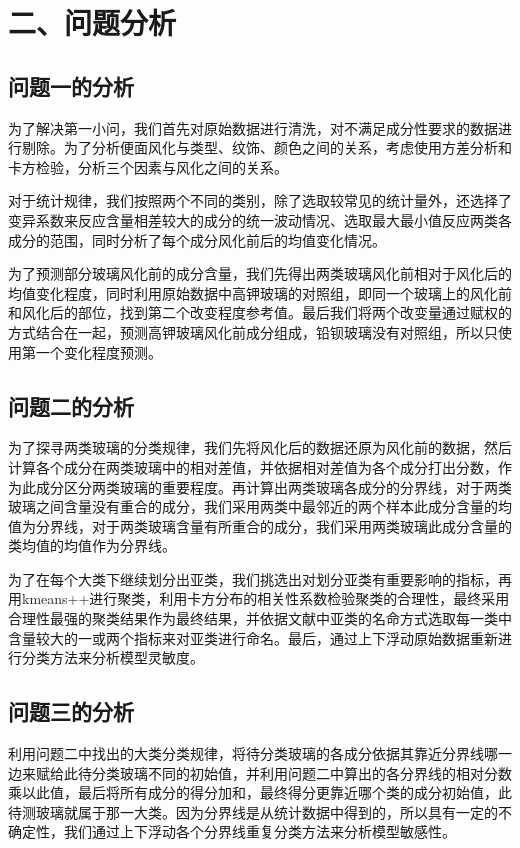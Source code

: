 \documentclass{my_paper}
\begin{document}
\section{二、问题分析}
\subsection{问题一的分析}

为了解决第一小问，我们首先对原始数据进行清洗，对不满足成分性要求的数据进行剔除。为了分析便面风化与类型、纹饰、颜色之间的关系，考虑使用方差分析和卡方检验，分析三个因素与风化之间的关系。

对于统计规律，我们按照两个不同的类别，除了选取较常见的统计量外，还选择了变异系数来反应含量相差较大的成分的统一波动情况、选取最大最小值反应两类各成分的范围，同时分析了每个成分风化前后的均值变化情况。

为了预测部分玻璃风化前的成分含量，我们先得出两类玻璃风化前相对于风化后的均值变化程度，同时利用原始数据中高钾玻璃的对照组，即同一个玻璃上的风化前和风化后的部位，找到第二个改变程度参考值。最后我们将两个改变量通过赋权的方式结合在一起，预测高钾玻璃风化前成分组成，铅钡玻璃没有对照组，所以只使用第一个变化程度预测。

\subsection{问题二的分析}

为了探寻两类玻璃的分类规律，我们先将风化后的数据还原为风化前的数据，然后计算各个成分在两类玻璃中的相对差值，并依据相对差值为各个成分打出分数，作为此成分区分两类玻璃的重要程度。再计算出两类玻璃各成分的分界线，对于两类玻璃之间含量没有重合的成分，我们采用两类中最邻近的两个样本此成分含量的均值为分界线，对于两类玻璃含量有所重合的成分，我们采用两类玻璃此成分含量的类均值的均值作为分界线。

为了在每个大类下继续划分出亚类，我们挑选出对划分亚类有重要影响的指标，再用kmeans++进行聚类，利用卡方分布的相关性系数检验聚类的合理性，最终采用合理性最强的聚类结果作为最终结果，并依据文献中亚类的名命方式选取每一类中含量较大的一或两个指标来对亚类进行命名。最后，通过上下浮动原始数据重新进行分类方法来分析模型灵敏度。

\subsection{问题三的分析}
利用问题二中找出的大类分类规律，将待分类玻璃的各成分依据其靠近分界线哪一边来赋给此待分类玻璃不同的初始值，并利用问题二中算出的各分界线的相对分数乘以此值，最后将所有成分的得分加和，最终得分更靠近哪个类的成分初始值，此待测玻璃就属于那一大类。因为分界线是从统计数据中得到的，所以具有一定的不确定性，我们通过上下浮动各个分界线重复分类方法来分析模型敏感性。
\end{document}
